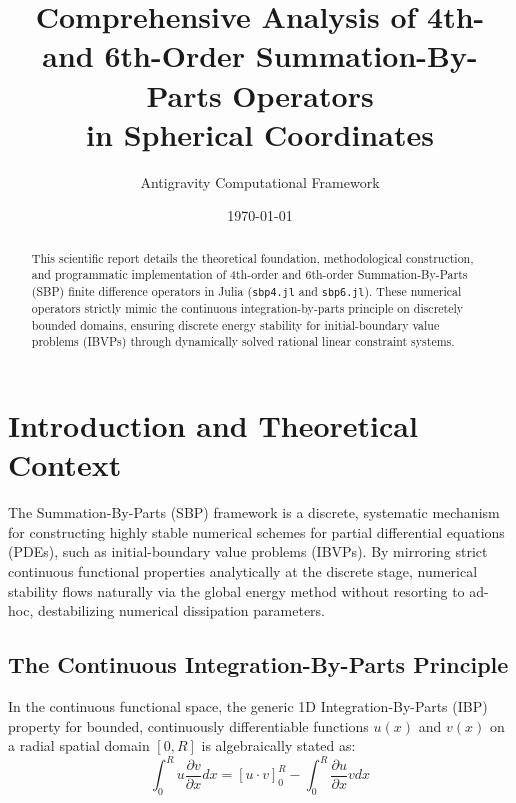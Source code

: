 \documentclass[reprint,amsmath,amssymb,aps]{revtex4-2}
\begin{document}
\title{Comprehensive Analysis of 4th- and 6th-Order Summation-By-Parts Operators \\ in Spherical Coordinates}

\author{Antigravity Computational Framework}
\date{\today}

\begin{abstract}
This scientific report details the theoretical foundation, methodological construction, and programmatic implementation of 4th-order and 6th-order Summation-By-Parts (SBP) finite difference operators in Julia (\texttt{sbp4.jl} and \texttt{sbp6.jl}). These numerical operators strictly mimic the continuous integration-by-parts principle on discretely bounded domains, ensuring discrete energy stability for initial-boundary value problems (IBVPs) through dynamically solved rational linear constraint systems.
\end{abstract}

\maketitle

\section{Introduction and Theoretical Context}

The Summation-By-Parts (SBP) framework is a discrete, systematic mechanism for constructing highly stable numerical schemes for partial differential equations (PDEs), such as initial-boundary value problems (IBVPs). By mirroring strict continuous functional properties analytically at the discrete stage, numerical stability flows naturally via the global energy method without resorting to ad-hoc, destabilizing numerical dissipation parameters.

\subsection{The Continuous Integration-By-Parts Principle}
In the continuous functional space, the generic 1D Integration-By-Parts (IBP) property for bounded, continuously differentiable functions $u(x)$ and $v(x)$ on a radial spatial domain $[0, R]$ is algebraically stated as:
\begin{equation}
    \int_0^R u \frac{\partial v}{\partial x} dx = \left[ u \cdot v \right]_0^R - \int_0^R \frac{\partial u}{\partial x} v dx
\end{equation}
\end{document}
